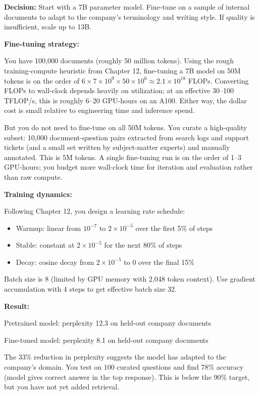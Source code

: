 \textbf{Decision:} Start with a 7B parameter model. Fine-tune on a sample of internal documents to adapt to the company's terminology and writing style. If quality is insufficient, scale up to 13B.

\textbf{Fine-tuning strategy:}

You have 100,000 documents (roughly 50 million tokens). Using the rough training-compute heuristic from Chapter 12, fine-tuning a 7B model on 50M tokens is on the order of $6 \times 7 \times 10^9 \times 50 \times 10^6 \approx 2.1 \times 10^{18}$ FLOPs. Converting FLOPs to wall-clock depends heavily on utilization; at an effective 30--100 TFLOP/s, this is roughly 6--20 GPU-hours on an A100. Either way, the dollar cost is small relative to engineering time and inference spend.

But you do not need to fine-tune on all 50M tokens. You curate a high-quality subset: 10,000 document-question pairs extracted from search logs and support tickets (and a small set written by subject-matter experts) and manually annotated. This is 5M tokens. A single fine-tuning run is on the order of 1--3 GPU-hours; you budget more wall-clock time for iteration and evaluation rather than raw compute.

\textbf{Training dynamics:}

Following Chapter 12, you design a learning rate schedule:
\begin{itemize}
\item Warmup: linear from $10^{-7}$ to $2 \times 10^{-5}$ over the first 5\% of steps
\item Stable: constant at $2 \times 10^{-5}$ for the next 80\% of steps
\item Decay: cosine decay from $2 \times 10^{-5}$ to 0 over the final 15\%
\end{itemize}

Batch size is 8 (limited by GPU memory with 2,048 token context). Use gradient accumulation with 4 steps to get effective batch size 32.

\textbf{Result:}

Pretrained model: perplexity 12.3 on held-out company documents

Fine-tuned model: perplexity 8.1 on held-out company documents

The 33\% reduction in perplexity suggests the model has adapted to the company's domain. You test on 100 curated questions and find 78\% accuracy (model gives correct answer in the top response). This is below the 90\% target, but you have not yet added retrieval.

